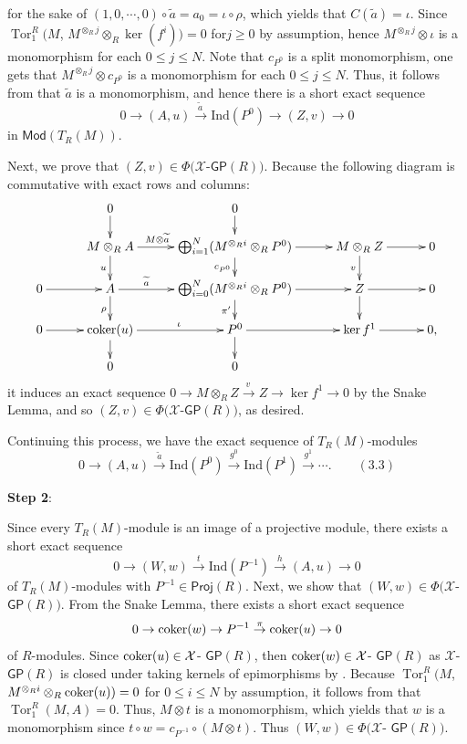 \documentclass[10pt,twoside]{amsart}
\theoremstyle{bfupright head,slanted body}
\theoremstyle{bfupright head,upright body}
\theoremstyle{fixed bf head,slanted body}
\theoremstyle{fixed bf head,upright body}
\theoremstyle{numbered paragraph}
\newenvironment{prf*}[1][Proof]{%
  \begin{proof}[\bf #1]
    \setcounter{equation}{0}
    \renewcommand{\theequation}{\arabic{equation}}}
  {\end{proof}
}
\numberwithin{equation}{res}
\newcommand{\GP}{\mathsf{GP}}
\newcommand{\Proj}{\mathsf{Proj}}
\newcommand{\Mod}{\mathsf{Mod}}
\newcommand{\Ind}{\mathrm{Ind}}
\newcommand{\cok}{\mbox{\rm coker}}
\newcommand{\Tor}{\operatorname{Tor}}
\begin{document}
\begin{prf*}
\begin{equation*}
\end{equation*}
for the sake of $(1,0,\cdots,0) \circ \widetilde{a}=a_0=\iota \circ \rho$, which yields that $C(\widetilde{a})=\iota$. 
Since $\Tor^R_1(M$, $M^{\otimes_Rj}\otimes_R\ker(f^{i}))=0$ for$j\geqslant 0$ by assumption,
hence $M^{\otimes_Rj}\otimes \iota$ is a monomorphism for each $0 \leqslant j \leqslant N$.
Note that $c_{P^{0}}$ is a split monomorphism,
one gets that $M^{\otimes_Rj}\otimes c_{P^{0}}$ is a monomorphism
for each $0 \leqslant j \leqslant N$.
Thus, it follows from \cite[Lemma 2.9]{DL} that $\widetilde{a}$ is a monomorphism, 
and hence there is a short exact sequence
$$ 0 \to (A, u) \overset{\widetilde{a}\,}\rightarrow \Ind(P^{0})\to (Z, v) \to 0$$
in $\Mod(T_R(M))$.

Next, we prove that $(Z, v) \in \Phi(\mathcal{X}$-$\GP(R))$.
Because the following diagram is commutative with exact rows and columns:
\begin{equation*} \label{factorization 1}
\xymatrix@C=1cm@R=0.5cm{
  & 0 \ar[d]^{} & 0 \ar[d]^{}  \\
  & M\otimes_R A \ar[d]_{u} \ar[r]^{M\otimes \widetilde{a} \,\,\, \qquad}
  & \bigoplus_{i=1}^N(M^{\otimes_Ri}\otimes_RP^{0}) \ar[d]_{c_{P^{0}}} \ar[r]^{}
  & M\otimes_R Z \ar[d]_{v} \ar[r]^{} & 0  \\
  0 \ar[r]^{}
  & A \ar[d]_{\rho} \ar[r]^-{\widetilde{a}}
  & \bigoplus_{i=0}^N(M^{\otimes_Ri}\otimes_RP^{0})
    \ar[d]_{\pi'} \ar[r]^{}
  & Z \ar[d]_{} \ar[r]^{} & 0  \\
  0 \ar[r]^{}
  & \cok(u) \ar[r]^{\quad \iota} \ar[d]^{}
  & P^{0} \ar[r]^{} \ar[d]^{}
  & \ker f^{1} \ar[r]^{}  & 0 , \\
  & 0  & 0   }
\end{equation*}
it induces an exact sequence
$0 \to M\otimes_R Z \overset{v \,}\rightarrow Z \to\ker f^{1} \to 0$
by the Snake Lemma, and so $(Z, v) \in \Phi(\mathcal{X}$-$\GP(R))$, as desired.

Continuing this process, we have the exact sequence of $T_R(M)$-modules
$$0 \to (A, u) \overset{\widetilde{a}}\to \Ind(P^{0})\overset{g^{0}}\to\Ind(P^{1}) \overset{g^{1}} \to \cdots. \qquad (3.3)$$

\textbf{Step 2}:

Since every $T_R(M)$-module is an image of a projective module, 
there exists a short exact sequence
$$ 0 \to (W, w) \overset{t}\longrightarrow \Ind(P^{-1})
             \overset{h}\longrightarrow (A, u) \to 0$$
of $T_R(M)$-modules with $P^{-1} \in \Proj(R)$.
Next, we show that $(W, w) \in \Phi(\mathcal{X}$-$\GP(R))$.
From the Snake Lemma,
there exists a short exact sequence
$$0 \to \cok(w) \to P^{-1} \overset{\pi}\to \cok(u) \to 0$$
of $R$-modules. Since $\cok(u)\in\mathcal{X}$- $\GP(R)$, then $\cok(w) \in \mathcal{X}$- $\GP(R)$ 
as $\mathcal{X}$- $\GP(R)$ is closed under taking kernels of epimorphisms by \cite[Theorem 2.3]{BO}.
Because $\Tor^R_1(M$, $M^{\otimes_Ri}\otimes_R\cok(u))=0$ for $0\leqslant i\leqslant N$ by assumption, 
it follows from \cite[Lemma 2.8]{DL} that $\Tor^R_1(M, A)=0$. Thus, $M\otimes t$ is a monomorphism, 
which yields that $w$ is a monomorphism since $t\circ w= c_{P^{-1}}\circ(M\otimes t)$.
Thus $(W, w) \in \Phi(\mathcal{X}$- $\GP(R))$.


\end{prf*}
\end{document}
